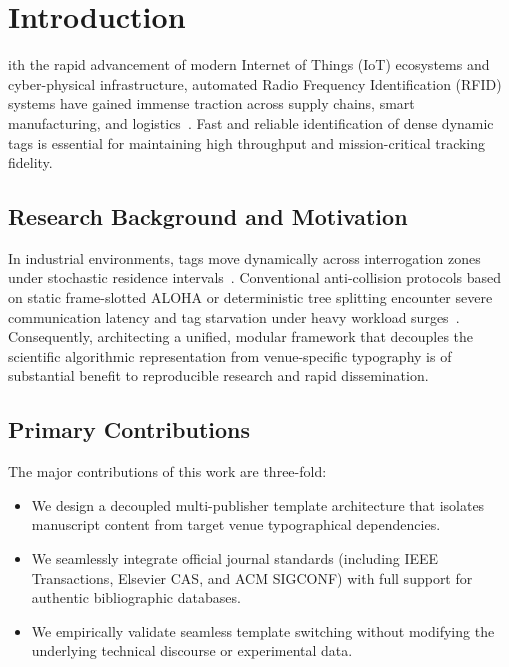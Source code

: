 
\section{Introduction}
\label{sec:introduction}

ith the rapid advancement of modern Internet of Things (IoT) ecosystems and cyber-physical infrastructure, automated Radio Frequency Identification (RFID) systems have gained immense traction across supply chains, smart manufacturing, and logistics~\cite{Industry5,RFID-application1}. Fast and reliable identification of dense dynamic tags is essential for maintaining high throughput and mission-critical tracking fidelity.

\subsection{Research Background and Motivation}
In industrial environments, tags move dynamically across interrogation zones under stochastic residence intervals~\cite{RFID-in-IOT}. Conventional anti-collision protocols based on static frame-slotted ALOHA or deterministic tree splitting encounter severe communication latency and tag starvation under heavy workload surges~\cite{EPC-C1-Gen2,TAD}. Consequently, architecting a unified, modular framework that decouples the scientific algorithmic representation from venue-specific typography is of substantial benefit to reproducible research and rapid dissemination.

\subsection{Primary Contributions}
The major contributions of this work are three-fold:
\begin{itemize}
    \item We design a decoupled multi-publisher template architecture that isolates manuscript content from target venue typographical dependencies.
    \item We seamlessly integrate official journal standards (including IEEE Transactions, Elsevier CAS, and ACM SIGCONF) with full support for authentic bibliographic databases.
    \item We empirically validate seamless template switching without modifying the underlying technical discourse or experimental data.
\end{itemize}
